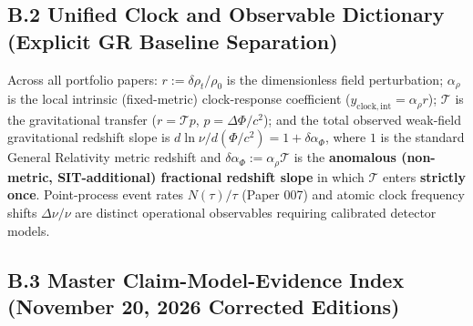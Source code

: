 \documentclass[
  american,
  11pt,
  letterpaper,
]{article}
\begin{document}
\subsection{B.2 Unified Clock and Observable Dictionary (Explicit GR Baseline Separation)}\label{b.2-unified-clock-and-observable-dictionary-explicit-gr-baseline-separation}

Across all portfolio papers: \(r := \delta\rho_t/\rho_0\) is the dimensionless field perturbation; \(\alpha_\rho\) is the local intrinsic (fixed-metric) clock-response coefficient (\(y_{\mathrm{clock,int}} = \alpha_\rho r\)); \(\mathcal{T}\) is the gravitational transfer (\(r = \mathcal{T} p\), \(p = \Delta\Phi/c^2\)); and the total observed weak-field gravitational redshift slope is \(d\ln\nu / d(\Phi/c^2) = 1 + \delta\alpha_\Phi\), where \(1\) is the standard General Relativity metric redshift and \(\delta\alpha_\Phi := \alpha_\rho\mathcal{T}\) is the \textbf{anomalous (non-metric, SIT-additional) fractional redshift slope} in which \(\mathcal{T}\) enters \textbf{strictly once}. Point-process event rates \(N(\tau)/\tau\) (Paper 007) and atomic clock frequency shifts \(\Delta\nu/\nu\) are distinct operational observables requiring calibrated detector models.

\subsection{B.3 Master Claim-Model-Evidence Index (November 20, 2026 Corrected Editions)}\label{b.3-master-claim-model-evidence-index-november-20-2026-corrected-editions}
\end{document}
